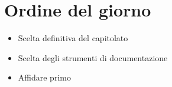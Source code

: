 \section{Ordine del giorno}
\begin{itemize}
\item Scelta definitiva del capitolato
\item Scelta degli strumenti di documentazione
\item Affidare primo \SdF{}

\end{itemize}